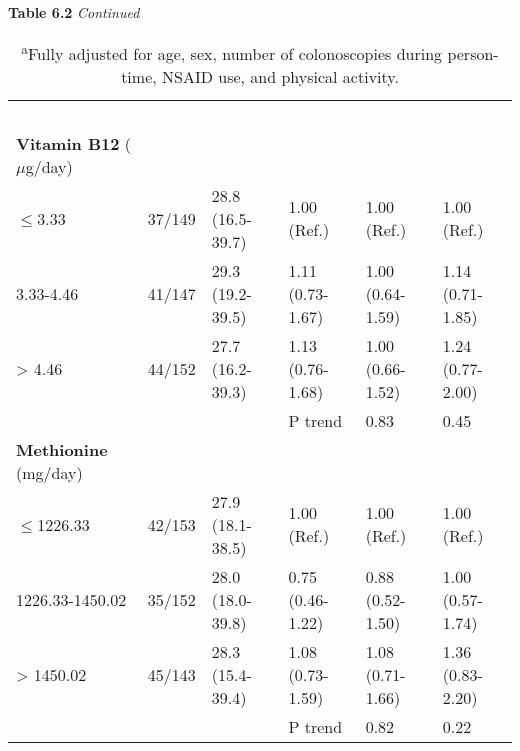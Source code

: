 \begin{sidewaystable}
\caption*{\textbf{Table 6.2} \emph{Continued}}
\label{table6_2}
\begin{adjustbox}{width=\textwidth}
\begin{tabular}{L{2.7cm}C{2.5cm}C{3.1cm}C{3.1cm}C{3.1cm}C{3.1cm}}

~ & ~ & ~ & ~ & ~ & ~ \\
{\textbf{Vitamin B12}}{ ($\mu$g/day)} & ~ & ~ & ~ & ~ & ~ \\
{\textrm{${\leq}$}}{3.33} & 37/149 & 28.8 (16.5-39.7) & 1.00 (Ref.) & 1.00 (Ref.) & 1.00 (Ref.)\\
3.33-4.46 & 41/147 & 29.3 (19.2-39.5) & 1.11 (0.73-1.67) & 1.00 (0.64-1.59) & 1.14 (0.71-1.85)\\
{\textgreater} 4.46 & 44/152 & 27.7 (16.2-39.3) & 1.13 (0.76-1.68) & 1.00 (0.66-1.52) & 1.24 (0.77-2.00)\\ ~ & ~ & ~ & P trend & 0.83 & 0.45\\

{\textbf{Methionine}}{ (mg/day)} & ~ & ~ & ~ & ~ & ~ \\
{\textrm{${\leq}$}}{1226.33} & 42/153 & 27.9 (18.1-38.5) & 1.00 (Ref.) & 1.00 (Ref.) & 1.00 (Ref.)\\
1226.33-1450.02 & 35/152 & 28.0 (18.0-39.8) & 0.75 (0.46-1.22) & 0.88 (0.52-1.50) & 1.00 (0.57-1.74)\\
{\textgreater} 1450.02 & 45/143 & 28.3 (15.4-39.4) & 1.08 (0.73-1.59) & 1.08 (0.71-1.66) & 1.36 (0.83-2.20)\\ ~ & ~ & ~ & P trend & 0.82 & 0.22\\
\hline
\end{tabular}
\end{adjustbox}
\caption*{\footnotesize{\textsuperscript{a}Fully adjusted for age, sex, number of colonoscopies during person-time, NSAID use, and physical activity.}}
\end{sidewaystable}


